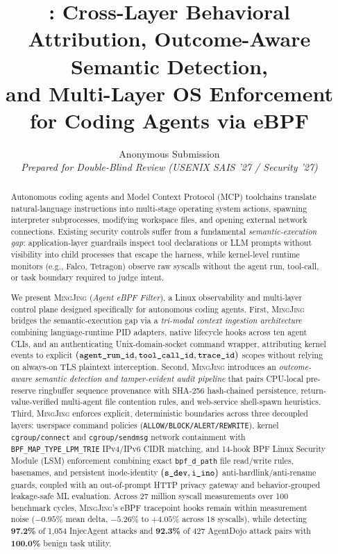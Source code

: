 \documentclass[10pt,twocolumn,letterpaper]{article}
\title{\Large \bf \sys{}: Cross-Layer Behavioral Attribution, Outcome-Aware Semantic Detection,\\and Multi-Layer OS Enforcement for Coding Agents via eBPF}
\author{
  Anonymous Submission\\
  \textit{Prepared for Double-Blind Review (USENIX SAIS '27 / Security '27)}
}
\date{}
\newcommand{\sys}{\textsc{MingJing}}
\newcommand{\code}[1]{\texttt{\small #1}}
\begin{document}
\maketitle

\begin{abstract}
Autonomous coding agents and Model Context Protocol (MCP) toolchains translate natural-language instructions into multi-stage operating system actions, spawning interpreter subprocesses, modifying workspace files, and opening external network connections. Existing security controls suffer from a fundamental \emph{semantic-execution gap}: application-layer guardrails inspect tool declarations or LLM prompts without visibility into child processes that escape the harness, while kernel-level runtime monitors (e.g., Falco, Tetragon) observe raw syscalls without the agent run, tool-call, or task boundary required to judge intent.

We present \sys{} (\emph{Agent eBPF Filter}), a Linux observability and multi-layer control plane designed specifically for autonomous coding agents. First, \sys{} bridges the semantic-execution gap via a \emph{tri-modal context ingestion architecture} combining language-runtime PID adapters, native lifecycle hooks across ten agent CLIs, and an authenticating Unix-domain-socket command wrapper, attributing kernel events to explicit $(\code{agent\_run\_id}, \code{tool\_call\_id}, \code{trace\_id})$ scopes without relying on always-on TLS plaintext interception. Second, \sys{} introduces an \emph{outcome-aware semantic detection and tamper-evident audit pipeline} that pairs CPU-local pre-reserve ringbuffer sequence provenance with SHA-256 hash-chained persistence, return-value-verified multi-agent file contention rules, and web-service shell-spawn heuristics. Third, \sys{} enforces explicit, deterministic boundaries across three decoupled layers: userspace command policies (\code{ALLOW/BLOCK/ALERT/REWRITE}), kernel \code{cgroup/connect} and \code{cgroup/sendmsg} network containment with \code{BPF\_MAP\_TYPE\_LPM\_TRIE} IPv4/IPv6 CIDR matching, and 14-hook BPF Linux Security Module (LSM) enforcement combining exact \code{bpf\_d\_path} file read/write rules, basenames, and persistent inode-identity $(\code{s\_dev}, \code{i\_ino})$ anti-hardlink/anti-rename guards, coupled with an out-of-prompt HTTP privacy gateway and behavior-grouped leakage-safe ML evaluation. Across 27 million syscall measurements over 100 benchmark cycles, \sys{}'s eBPF tracepoint hooks remain within measurement noise ($-0.95\%$ mean delta, $-5.26\%$ to $+4.05\%$ across 18 syscalls), while detecting \textbf{97.2\%} of 1,054 InjecAgent attacks and \textbf{92.3\%} of 427 AgentDojo attack pairs with \textbf{100.0\%} benign task utility.
\end{abstract}
\end{document}
